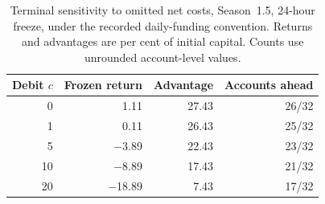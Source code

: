 \begin{table}[ht]
\centering
\caption{Terminal sensitivity to omitted net costs, Season~1.5, 24-hour
freeze, under the recorded daily-funding convention. Returns and advantages
are per cent of initial capital. Counts use unrounded account-level values.}
\label{tab:omittedcost}
\begin{tabular}{rrrr}
\toprule
Debit $c$ & Frozen return & Advantage & Accounts ahead \\
\midrule
0 & 1.11 & 27.43 & 26/32 \\
1 & 0.11 & 26.43 & 25/32 \\
5 & \ensuremath{-}3.89 & 22.43 & 23/32 \\
10 & \ensuremath{-}8.89 & 17.43 & 21/32 \\
20 & \ensuremath{-}18.89 & 7.43 & 17/32 \\
\bottomrule
\end{tabular}
\end{table}
